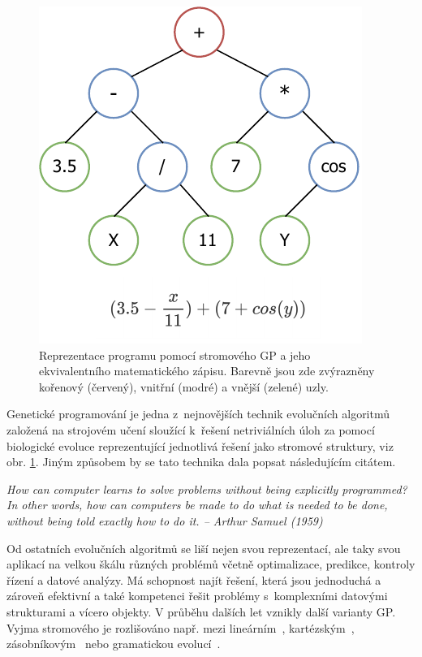 \begin{figure}[b!]
    \centering
    \includegraphics{obrazky-figures/tree.pdf}
    \caption{Reprezentace programu pomocí stromového GP a jeho ekvivalentního matematického zápisu. Barevně jsou zde zvýrazněny kořenový (červený), vnitřní (modré) a vnější (zelené) uzly.}
    \label{fig:tgp_representation}
\end{figure}

Genetické programování je jedna z~nejnovějších technik evolučních algoritmů založená na strojovém učení sloužící k~řešení netriviálních úloh za pomocí biologické evoluce reprezentující jednotlivá řešení jako stromové struktury, viz obr. \ref{fig:tgp_representation}. Jiným způsobem by se tato technika dala popsat následujícím citátem.
\vspace{0.2cm}
\begin{center}
\emph{How can computer learns to solve problems without being explicitly programmed? In other words, how can computers be made to do what is needed to be done, without being told exactly how to do it. -- Arthur Samuel (1959)}
\end{center}
\vspace{0.2cm}

Od ostatních evolučních algoritmů se liší nejen svou reprezentací, ale taky svou aplikací na velkou škálu různých problémů včetně optimalizace, predikce, kontroly řízení a datové analýzy. Má schopnost najít řešení, která jsou jednoduchá a zároveň efektivní a také kompetenci řešit problémy s~komplexními datovými strukturami a vícero objekty. V průběhu dalších let vznikly další varianty GP. Vyjma stromového je rozlišováno např. mezi lineárním~\cite{LGP}, kartézským~\cite{CGP}, zásobníkovým~\cite{SBGP} nebo gramatickou evolucí~\cite{wiki:Genetic_programming}.

